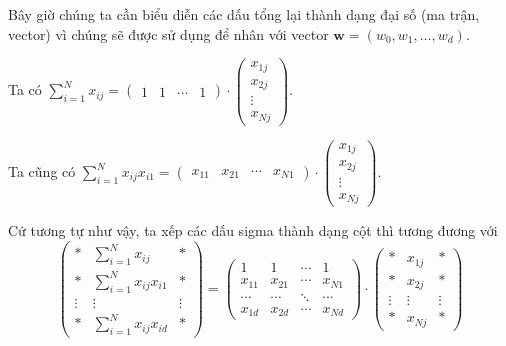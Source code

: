 Bây giờ chúng ta cần biểu diễn các dấu tổng lại thành dạng đại số (ma trận, vector) vì chúng sẽ được sử dụng để nhân với vector $\bm{w} = (w_0, w_1, \ldots, w_d)$.

Ta có $\sum_{i=1}^N x_{ij} = \begin{pmatrix}
    1 & 1 & \cdots & 1
\end{pmatrix} \cdot \begin{pmatrix}
    x_{1j} \\ x_{2j} \\ \vdots \\ x_{Nj}
\end{pmatrix}$.

Ta cũng có $\sum_{i=1}^N x_{ij} x_{i1} = \begin{pmatrix}
    x_{11} & x_{21} & \cdots & x_{N1}
\end{pmatrix} \cdot \begin{pmatrix}
    x_{1j} \\ x_{2j} \\ \vdots \\ x_{Nj}
\end{pmatrix}$.

Cứ tương tự như vậy, ta xếp các dấu sigma thành dạng cột thì tương đương với \[\begin{pmatrix}
    * & \sum_{i=1}^N x_{ij} & * \\ * & \sum_{i=1}^N x_{ij} x_{i1} & * \\ \vdots & \vdots & \vdots \\ * & \sum_{i=1}^N x_{ij} x_{id} & *
\end{pmatrix} = \begin{pmatrix}
    1 & 1 & \cdots & 1 \\ x_{11} & x_{21} & \cdots & x_{N1} \\ \cdots & \cdots & \ddots & \cdots \\ x_{1d} & x_{2d} & \cdots & x_{Nd} 
\end{pmatrix} \cdot \begin{pmatrix}
    * & x_{1j} & * \\ * & x_{2j} & * \\ \vdots & \vdots & \vdots \\ * & x_{Nj} & *
\end{pmatrix}\]

